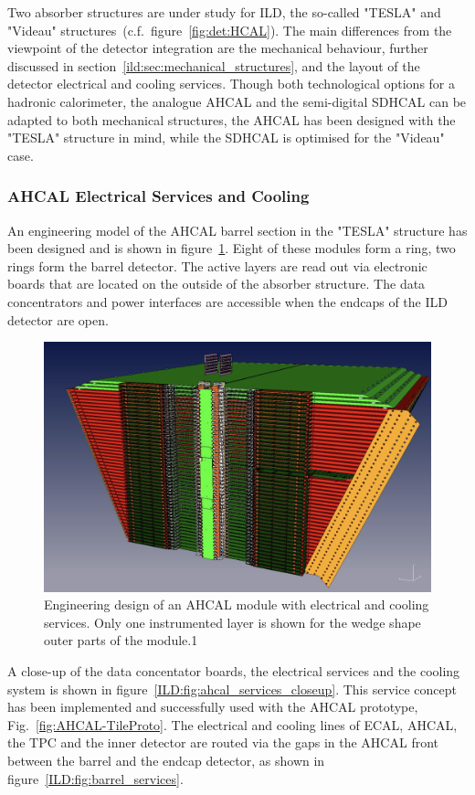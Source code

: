 Two absorber structures are under study for ILD, the so-called "TESLA" and "Videau" structures~(c.f.~figure~\ref{fig:det:HCAL}). The main differences from the viewpoint of the detector integration are the mechanical behaviour, further discussed in section~\ref{ild:sec:mechanical_structures}, and the layout of the detector electrical and cooling services. Though both technological options for a hadronic calorimeter, the analogue AHCAL and the semi-digital SDHCAL can be adapted to both mechanical structures, the AHCAL has been designed with the "TESLA" structure in mind, while the SDHCAL is optimised for the "Videau" case.

\subsubsection{AHCAL Electrical Services and Cooling}
An engineering model of the AHCAL barrel section in the "TESLA" structure has been designed and is shown in figure~\ref{ILD:fig:ahcal_module_services}. Eight of these modules form a ring, two rings form the barrel detector. The active layers are read out via electronic boards that are located on the outside of the absorber structure. The data concentrators and power interfaces are accessible when the endcaps of the ILD detector are open.  
\begin{figure}[h!]
    \centering
        \includegraphics[width=0.8\hsize]{Integration/fig/AHCAL_Module_Services.png}
    \caption{Engineering design of an AHCAL module with electrical and cooling services. Only one instrumented layer is shown for the wedge shape outer parts of the module.1}
    \label{ILD:fig:ahcal_module_services}
\end{figure}
A close-up of the data concentator boards, the electrical services and the cooling system is shown in figure~\ref{ILD:fig:ahcal_services_closeup}. This service concept has been implemented and successfully used with the AHCAL prototype, Fig.~\ref{fig:AHCAL-TileProto}. The electrical and cooling lines of ECAL, AHCAL, the TPC and the inner detector are routed via the gaps in the AHCAL front between the barrel and the endcap detector, as shown in figure~\ref{ILD:fig:barrel_services}. 
